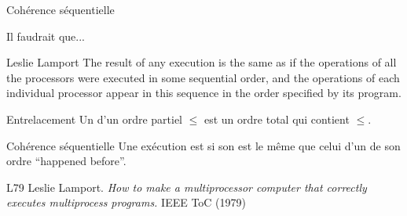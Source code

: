 
\begingroup

\begin{frame}[fragile]{Cohérence séquentielle}

  \begin{block}{Il faudrait que...}
    \begin{shadequote}{Leslie Lamport}
      The result of any execution is the same as if the operations of all the processors were executed in some sequential order,
      and the operations of each individual processor appear in this sequence in the order specified by its program.
    \end{shadequote}
  \end{block}
  \vfill
  \begin{block}{Entrelacement}
    Un  d'un ordre partiel $\le$ est un ordre total qui contient $\le$. 
  \end{block}
  \begin{block}{Cohérence séquentielle}
    Une exécution est  si son  est \alert{le même que} celui d'un  de son ordre ``happened before''.
  \end{block}

  \vfill
  \begin{citing}
  \item[L79] Leslie Lamport. \textit{How to make a multiprocessor computer that correctly executes multiprocess programs.} IEEE ToC (1979)
  \end{citing}
\end{frame}

\endgroup
\endinput
